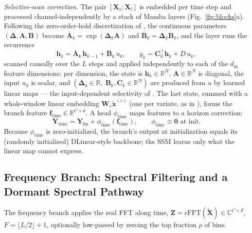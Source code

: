 \documentclass[runningheads]{llncs}
\begin{document}
\emph{Selective-scan correction.} The pair $[\mathbf{X}_s; \mathbf{X}_t]$
is embedded per time step and processed channel-independently by a stack
of Mamba layers \cite{mamba} (Fig.~\ref{fig:blocks}a). Following the
zero-order-hold discretization of \cite{mamba}, the continuous parameters
$(\boldsymbol{\Delta}, \mathbf{A}, \mathbf{B})$ become
$\bar{\mathbf{A}}_k = \exp(\boldsymbol{\Delta}_k \mathbf{A})$ and
$\bar{\mathbf{B}}_k = \boldsymbol{\Delta}_k \mathbf{B}_k$, and the layer
runs the recurrence
\begin{equation}
\mathbf{h}_k = \bar{\mathbf{A}}_k\,\mathbf{h}_{k-1} +
\bar{\mathbf{B}}_k\, u_k, \qquad
y_k = \mathbf{C}_k^{\top} \mathbf{h}_k + D\, u_k ,
\label{eq:ssm}
\end{equation}
scanned causally over the $L$ steps and applied independently to each of
the $d_{\mathrm{in}}$ feature dimensions: per dimension, the state is
$\mathbf{h}_k \in \mathbb{R}^{N}$, $\mathbf{A} \in \mathbb{R}^{N}$ is
diagonal, the input $u_k$ is scalar, and
$(\boldsymbol{\Delta}_k \in \mathbb{R},\; \mathbf{B}_k, \mathbf{C}_k \in
\mathbb{R}^{N})$ are produced from $u$ by learned linear maps ---
the input-dependent selectivity of \cite{mamba}. The last state, summed
with a whole-window linear embedding $\mathbf{W}_e \tilde{\mathbf{x}}^{(c)}$
(one per variate, as in \cite{smamba}), forms the branch feature
$\mathbf{f}_{\mathrm{time}} \in \mathbb{R}^{C \times d}$. A head
$\phi_{\mathrm{time}}$ maps features to a horizon correction:
\begin{equation}
\mathbf{Y}_{\mathrm{time}} = \mathbf{Y}_{\mathrm{lin}} +
\phi_{\mathrm{time}}(\mathbf{f}_{\mathrm{time}}), \qquad
\phi_{\mathrm{time}} \equiv \mathbf{0} \text{ at init.}
\label{eq:timezero}
\end{equation}
Because $\phi_{\mathrm{time}}$ is zero-initialized, the branch's output at
initialization equals its (randomly initialized) DLinear-style backbone;
the SSM learns only what the linear map cannot express.

\subsection{Frequency Branch: Spectral Filtering and a Dormant Spectral Pathway}
\label{sec:freq}

The frequency branch applies the real FFT along time,
$\mathbf{Z} = \mathrm{rFFT}(\tilde{\mathbf{X}}) \in
\mathbb{C}^{C \times F}$, $F = \lfloor L/2 \rfloor + 1$, optionally
low-passed by zeroing the top fraction $\rho$ of bins.
\end{document}
